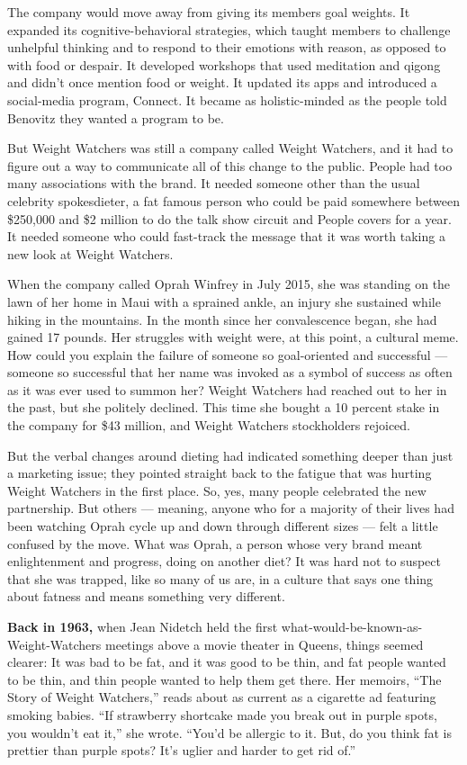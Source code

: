 The company would move away from giving its members goal weights. It
expanded its cognitive-behavioral strategies, which taught members to
challenge unhelpful thinking and to respond to their emotions with
reason, as opposed to with food or despair. It developed workshops that
used meditation and qigong and didn't once mention food or weight. It
updated its apps and introduced a social-media program, Connect. It
became as holistic-minded as the people told Benovitz they wanted a
program to be.

But Weight Watchers was still a company called Weight Watchers, and it
had to figure out a way to communicate all of this change to the public.
People had too many associations with the brand. It needed someone other
than the usual celebrity spokesdieter, a fat famous person who could be
paid somewhere between \$250,000 and \$2 million to do the talk show
circuit and People covers for a year. It needed someone who could
fast-track the message that it was worth taking a new look at Weight
Watchers.

When the company called Oprah Winfrey in July 2015, she was standing on
the lawn of her home in Maui with a sprained ankle, an injury she
sustained while hiking in the mountains. In the month since her
convalescence began, she had gained 17 pounds. Her struggles with weight
were, at this point, a cultural meme. How could you explain the failure
of someone so goal-oriented and successful --- someone so successful
that her name was invoked as a symbol of success as often as it was ever
used to summon her? Weight Watchers had reached out to her in the past,
but she politely declined. This time she bought a 10 percent stake in
the company for \$43 million, and Weight Watchers stockholders rejoiced.

But the verbal changes around dieting had indicated something deeper
than just a marketing issue; they pointed straight back to the fatigue
that was hurting Weight Watchers in the first place. So, yes, many
people celebrated the new partnership. But others --- meaning, anyone
who for a majority of their lives had been watching Oprah cycle up and
down through different sizes --- felt a little confused by the move.
What was Oprah, a person whose very brand meant enlightenment and
progress, doing on another diet? It was hard not to suspect that she was
trapped, like so many of us are, in a culture that says one thing about
fatness and means something very different.

\textbf{Back in 1963,} when Jean Nidetch held the first
what-would-be-known-as-Weight-Watchers meetings above a movie theater in
Queens, things seemed clearer: It was bad to be fat, and it was good to
be thin, and fat people wanted to be thin, and thin people wanted to
help them get there. Her memoirs, ``The Story of Weight Watchers,''
reads about as current as a cigarette ad featuring smoking babies. ``If
strawberry shortcake made you break out in purple spots, you wouldn't
eat it,'' she wrote. ``You'd be allergic to it. But, do you think fat is
prettier than purple spots? It's uglier and harder to get rid of.''

